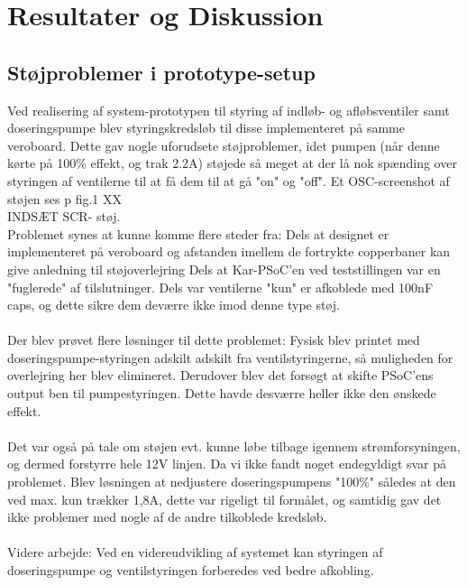 \section{Resultater og Diskussion}

\subsection{Støjproblemer i prototype-setup}

Ved realisering af system-prototypen til styring af indløb- og afløbsventiler samt doseringspumpe blev styringskredsløb til disse implementeret på samme veroboard. 
Dette gav nogle uforudsete støjproblemer, idet pumpen (når denne kørte på 100\% effekt, og trak 2.2A) støjede så meget at der lå nok spænding over styringen af ventilerne til at få dem til at gå "on" og "off".
Et OSC-screenshot af støjen ses p fig.1 XX\\

	INDSÆT SCR- støj.\\ 

Problemet synes at kunne komme flere steder fra: 
Dels at designet er implementeret på veroboard og afstanden imellem de fortrykte copperbaner kan give anledning til støjoverlejring
Dels at Kar-PSoC'en ved teststillingen var en "fuglerede" af tilslutninger. 
Dels var ventilerne "kun" er afkoblede med 100nF caps, og dette sikre dem deværre ikke imod denne type støj.\\\\

Der blev prøvet flere løsninger til dette problemet: 
Fysisk blev printet med doseringspumpe-styringen adskilt adskilt fra ventilstyringerne, så muligheden for overlejring her blev elimineret. 
Derudover blev det forsøgt at skifte PSoC'ens output ben til pumpestyringen. Dette havde desværre heller ikke den ønskede effekt.\\\\ 

Det var også på tale om støjen evt. kunne løbe tilbage igennem strømforsyningen, og dermed forstyrre hele 12V linjen. 
Da vi ikke fandt noget endegyldigt svar på problemet. Blev løsningen at nedjustere doseringspumpens "100\%" således at den ved max. kun trækker 1,8A, dette var rigeligt til formålet, og samtidig gav det ikke problemer med nogle af de andre tilkoblede kredsløb.\\\\


Videre arbejde:
Ved en videreudvikling af systemet kan styringen af doseringspumpe og ventilstyringen forberedes ved bedre afkobling.